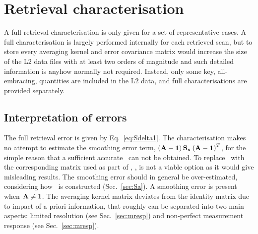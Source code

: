\chapter{Retrieval characterisation}
\label{chapter:characterisation}
%
A full retrieval characterisation is only given for a set of representative
cases. A full characterisation is largely performed internally for each
retrieved scan, but to store every averaging kernel and error covariance matrix
would increase the size of the L2 data files with at least two orders of
magnitude and such detailed information is anyhow normally not required.
Instead, only some key, all-embracing, quantities are included in the L2 data,
and full characterisations are provided separately.
 


\section{Interpretation of errors}
%
The full retrieval error is given by Eq.~\ref{eq:Sdelta1}. The characterisation
makes no attempt to estimate the smoothing error term,
$\left(\mathbf{A}-\mathbf{1}\right)\mathbf{S}_{\mathbf{x}}
\left(\mathbf{A}-\mathbf{1}\right)^T$, for the simple reason that a sufficient
accurate \aCvrMtr{\SttVct}\ can not be obtained. To replace \aCvrMtr{\SttVct}\
with the corresponding matrix used as part of \OEM, , is not a
viable option as it would give misleading results. The smoothing error should
in general be over-estimated, considering how \aCvrMtr{\SttVct}\ is constructed
(Sec.~\ref{sec:Sa}). A smoothing error is present when $\mathbf{A}\neq\mathbf{1}$.
The averaging kernel matrix deviates from the identity matrix due to impact of
a priori information, that roughly can be separated into two main aspects:
limited resolution (see Sec.~\ref{sec:mresp}) and non-perfect measurement
response (see Sec.~\ref{sec:mresp}).

